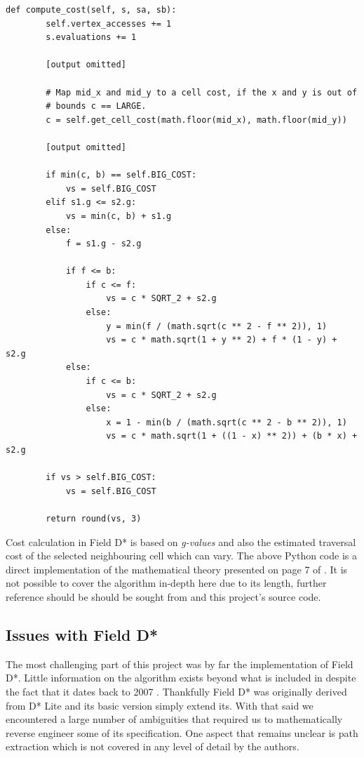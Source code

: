 \begin{lstlisting}
def compute_cost(self, s, sa, sb):
        self.vertex_accesses += 1
        s.evaluations += 1

        [output omitted]

        # Map mid_x and mid_y to a cell cost, if the x and y is out of
        # bounds c == LARGE.
        c = self.get_cell_cost(math.floor(mid_x), math.floor(mid_y))

		[output omitted]

        if min(c, b) == self.BIG_COST:
            vs = self.BIG_COST
        elif s1.g <= s2.g:
            vs = min(c, b) + s1.g
        else:
            f = s1.g - s2.g

            if f <= b:
                if c <= f:
                    vs = c * SQRT_2 + s2.g
                else:
                    y = min(f / (math.sqrt(c ** 2 - f ** 2)), 1)
                    vs = c * math.sqrt(1 + y ** 2) + f * (1 - y) + s2.g
            else:
                if c <= b:
                    vs = c * SQRT_2 + s2.g
                else:
                    x = 1 - min(b / (math.sqrt(c ** 2 - b ** 2)), 1)
                    vs = c * math.sqrt(1 + ((1 - x) ** 2)) + (b * x) + s2.g

        if vs > self.BIG_COST:
            vs = self.BIG_COST

        return round(vs, 3)
\end{lstlisting}

\noindent
Cost calculation in Field D* is based on \textit{g-values} and also the estimated traversal cost of the selected neighbouring cell which can vary. The above Python code is a direct implementation of the mathematical theory presented on page 7 of \cite{FIELD}. It is not possible to cover the algorithm in-depth here due to its length, further reference should be should be sought from \cite{FIELD, FIELD2} and this project's source code.

\subsection{Issues with Field D*}
\noindent
The most challenging part of this project was by far the implementation of Field D*. Little information on the algorithm exists beyond what is included in \cite{FIELD, FIELD2} despite the fact that it dates back to 2007 \cite{FIELD}. Thankfully Field D* was originally derived from D* Lite \cite{D*LITE} and its basic version simply extend its. With that said we encountered a large number of ambiguities that required us to mathematically reverse engineer some of its specification. One aspect that remains unclear is path extraction which is not covered in any level of detail by the authors. \\

